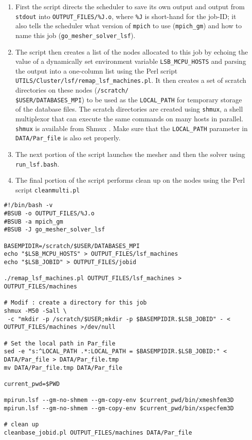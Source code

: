 \begin{enumerate}
\item First the script directs the scheduler to save its own output and
output from \texttt{stdout} into \texttt{\small OUTPUT\_FILES/\%J.o},
where \texttt{\%J} is short-hand for the job-ID; it also tells the
scheduler what version of \texttt{mpich} to use (\texttt{mpich\_gm})
and how to name this job (\texttt{go\_mesher\_solver\_lsf}).
\item The script then creates a list of the nodes allocated to this job
by echoing the value of a dynamically set environment variable \texttt{LSB\_MCPU\_HOSTS}
and parsing the output into a one-column list using the Perl script
\texttt{UTILS/Cluster/lsf/remap\_lsf\_machines.pl}. It then creates a set of scratch
directories on these nodes (\texttt{\small /scratch/}~\\
\texttt{\small \$USER/DATABASES\_MPI}) to be used as the \texttt{LOCAL\_PATH}
for temporary storage of the database files. The scratch directories
are created using \texttt{shmux}, a shell multiplexor that can execute
the same commands on many hosts in parallel. \texttt{shmux} is available
from Shmux . Make sure that the \texttt{LOCAL\_PATH}
parameter in \texttt{DATA/Par\_file} is also set properly.
\item The next portion of the script launches the mesher and then the solver
using \texttt{run\_lsf.bash}.
\item The final portion of the script performs clean up on the nodes using
the Perl script \texttt{cleanmulti.pl}
\end{enumerate}
{\small
\begin{verbatim}
#!/bin/bash -v
#BSUB -o OUTPUT_FILES/%J.o
#BSUB -a mpich_gm
#BSUB -J go_mesher_solver_lsf

BASEMPIDIR=/scratch/$USER/DATABASES_MPI
echo "$LSB_MCPU_HOSTS" > OUTPUT_FILES/lsf_machines
echo "$LSB_JOBID" > OUTPUT_FILES/jobid

./remap_lsf_machines.pl OUTPUT_FILES/lsf_machines > OUTPUT_FILES/machines

# Modif : create a directory for this job
shmux -M50 -Sall \
 -c "mkdir -p /scratch/$USER;mkdir -p $BASEMPIDIR.$LSB_JOBID" - < OUTPUT_FILES/machines >/dev/null

# Set the local path in Par_file
sed -e "s:^LOCAL_PATH .*:LOCAL_PATH = $BASEMPIDIR.$LSB_JOBID:" < DATA/Par_file > DATA/Par_file.tmp
mv DATA/Par_file.tmp DATA/Par_file

current_pwd=$PWD

mpirun.lsf --gm-no-shmem --gm-copy-env $current_pwd/bin/xmeshfem3D
mpirun.lsf --gm-no-shmem --gm-copy-env $current_pwd/bin/xspecfem3D

# clean up
cleanbase_jobid.pl OUTPUT_FILES/machines DATA/Par_file
\end{verbatim}
}


